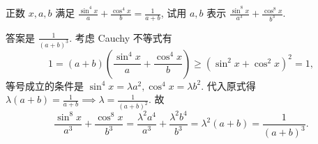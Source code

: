 \begin{prob}
\label{prob:prob-2}
正数 $x, a, b$ 满足
$\frac{\sin^4 x}{a} + \frac{\cos^4 x}{b} = \frac{1}{a+b}$,
试用 $a, b$ 表示 $\frac{\sin^8 x}{a^3} + \frac{\cos^8 x}{b^3}$.
\end{prob}

\begin{soln}
答案是 $\boxed{\tfrac{1}{(a+b)^3}.}$
考虑 Cauchy 不等式有
\[
1 = (a+b)\left(\frac{\sin^4 x}{a} + \frac{\cos^4 x}{b}\right)
  \ge (\sin^2 x + \cos^2 x)^2 = 1,
\]
等号成立的条件是 $\sin^4 x = \lambda a^2, \cos^4 x = \lambda b^2$.
代入原式得 $\lambda(a+b) = \frac{1}{a+b} \implies
\lambda = \frac{1}{(a+b)^2}$. 故
\[
\frac{\sin^8 x}{a^3} + \frac{\cos^8 x}{b^3} =
\frac{\lambda^2 a^4}{a^3} + \frac{\lambda^2 b^4}{b^3} =
\lambda^2(a+b) = \frac{1}{(a+b)^3}.
\]
\end{soln}
